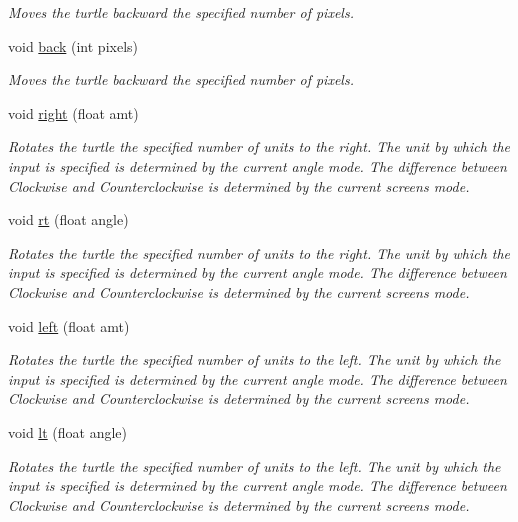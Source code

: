 \begin{DoxyCompactItemize}
\begin{DoxyCompactList}\small\item\em Moves the turtle backward the specified number of pixels. \end{DoxyCompactList}\item 
void \hyperlink{classcturtle_1_1Turtle_a3df431a36f6b1efa56c6b885ae22fde9}{back} (int pixels)
\begin{DoxyCompactList}\small\item\em Moves the turtle backward the specified number of pixels. \end{DoxyCompactList}\item 
void \hyperlink{classcturtle_1_1Turtle_a3586f116fccc417ffa74c115ec3eef54}{right} (float amt)
\begin{DoxyCompactList}\small\item\em Rotates the turtle the specified number of units to the right. The unit by which the input is specified is determined by the current angle mode. The difference between Clockwise and Counterclockwise is determined by the current screen\textquotesingle{}s mode. \end{DoxyCompactList}\item 
void \hyperlink{classcturtle_1_1Turtle_a5416304d65c9bbebe0fabd9914123a79}{rt} (float angle)
\begin{DoxyCompactList}\small\item\em Rotates the turtle the specified number of units to the right. The unit by which the input is specified is determined by the current angle mode. The difference between Clockwise and Counterclockwise is determined by the current screen\textquotesingle{}s mode. \end{DoxyCompactList}\item 
void \hyperlink{classcturtle_1_1Turtle_a60b8d0d7f9a80e4bca57bf3a788a6c01}{left} (float amt)
\begin{DoxyCompactList}\small\item\em Rotates the turtle the specified number of units to the left. The unit by which the input is specified is determined by the current angle mode. The difference between Clockwise and Counterclockwise is determined by the current screen\textquotesingle{}s mode. \end{DoxyCompactList}\item 
void \hyperlink{classcturtle_1_1Turtle_a4858ca94ff49171c615d319a307acb8d}{lt} (float angle)
\begin{DoxyCompactList}\small\item\em Rotates the turtle the specified number of units to the left. The unit by which the input is specified is determined by the current angle mode. The difference between Clockwise and Counterclockwise is determined by the current screen\textquotesingle{}s mode. \end{DoxyCompactList}\item 

\end{DoxyCompactItemize}
